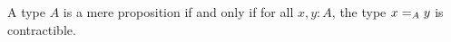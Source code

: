 \documentclass[hott-all.tex]{subfiles}
\begin{document}

\begin{lem}
  A type $A$ is a mere proposition if and only if for all $x,y:A$, the type $\id[A]xy$ is contractible.
\end{lem}
%
%
\end{document}
